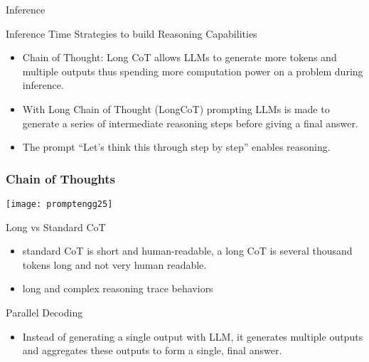 \begin{frame}[fragile]{Inference}

Inference Time Strategies to build Reasoning Capabilities 

    \begin{itemize}
        \item  Chain of Thought: Long CoT allows LLMs to generate more tokens and multiple outputs thus spending more computation power on a problem during inference. 
        \item  With Long Chain of Thought (LongCoT) prompting LLMs is made to generate a series of intermediate reasoning steps before giving a final answer. 
        \item  The prompt ``Let's think this through step by step'' enables reasoning.
    \end{itemize}
\end{frame}


\begin{frame}[fragile]\frametitle{Chain of Thoughts}
		\begin{center}
		\texttt{[image: promptengg25]}
		\end{center}

\end{frame}


\begin{frame}[fragile]{Long vs Standard CoT}


    \begin{itemize}
        \item  standard CoT is short and human-readable, a long CoT is several thousand tokens long  and not very human readable. 
		\item  long and complex reasoning trace behaviors
    \end{itemize}
\end{frame}

\begin{frame}[fragile]{Parallel Decoding}


    \begin{itemize}
        \item   Instead of generating a single output with LLM, it generates multiple 
outputs and aggregates these outputs to form a single, final answer. 
    \end{itemize}
\end{frame}


